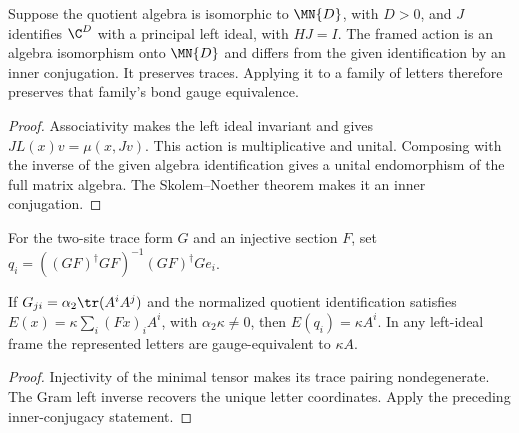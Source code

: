 \begin{lemma}
    \label{thm:spt_left_ideal_frame_realization}
    \leanok
    Suppose the quotient algebra is isomorphic to $\MN{D}$,
    with $D>0$, and $J$ identifies $\C^D$ with a principal left
    ideal, with $HJ=I$. The framed action is an algebra isomorphism
    onto $\MN{D}$ and differs from the given identification
    by an inner conjugation. It preserves traces. Applying it to
    a family of letters therefore preserves that family's bond gauge
    equivalence.
\end{lemma}
\begin{proof}\leanok
    Associativity makes the left ideal invariant and gives
    $JL(x)v=\mu(x,Jv)$. This action is multiplicative and unital.
    Composing with the inverse of the given algebra identification
    gives a unital endomorphism of the full matrix algebra.
    The Skolem--Noether theorem makes it an inner conjugation.
\end{proof}

\begin{definition}
    \label{def:spt_trace_quotient_letter_coordinates}
    \leanok
    For the two-site trace form $G$ and an injective section $F$, set
    $q_i=((GF)^\dagger GF)^{-1}(GF)^\dagger G e_i$.
\end{definition}

\begin{lemma}
    \label{thm:spt_trace_quotient_letter_recovery}
    \leanok
    If $G_{ji}=\alpha_2\tr(A^iA^j)$ and the normalized
    quotient identification satisfies
    $E(x)=\kappa\sum_i(Fx)_i A^i$, with $\alpha_2\kappa\ne0$,
    then $E(q_i)=\kappa A^i$. In any left-ideal frame the represented
    letters are gauge-equivalent to $\kappa A$.
\end{lemma}
\begin{proof}\leanok
    Injectivity of the minimal tensor makes its trace pairing
    nondegenerate. The Gram left inverse recovers the unique letter
    coordinates. Apply the preceding inner-conjugacy statement.
\end{proof}

